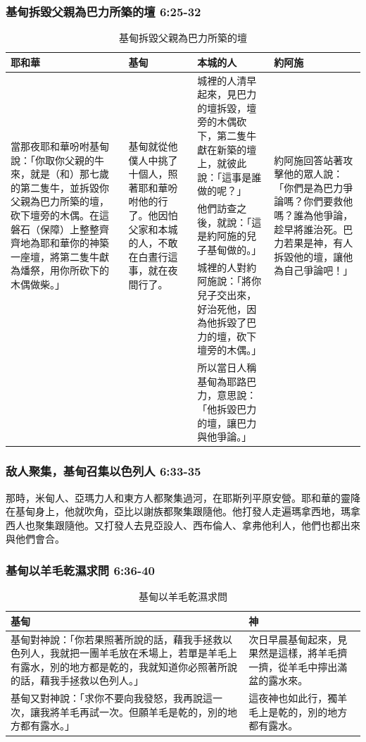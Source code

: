 \subsubsection{基甸拆毀父親為巴力所築的壇 6:25-32}
\begin{table}[H]
\centering
\begin{tabular}{p{4.7cm}|p{2.6cm}|p{6.38cm}|p{3.3cm}}\hline\hline
耶和華&基甸&本城的人&約阿施\\\hline
\multirow{3}{4.7cm}{當那夜耶和華吩咐基甸說：「你取你父親的牛來，就是（和）那七歲的第二隻牛，並拆毀你父親為巴力所築的壇，砍下壇旁的木偶。在這磐石（保障）上整整齊齊地為耶和華你的神築一座壇，將第二隻牛獻為燔祭，用你所砍下的木偶做柴。」}
&\multirow{3}{2.8cm}{基甸就從他僕人中挑了十個人，照著耶和華吩咐他的行了。他因怕父家和本城的人，不敢在白晝行這事，就在夜間行了。}
&城裡的人清早起來，見巴力的壇拆毀，壇旁的木偶砍下，第二隻牛獻在新築的壇上，就彼此說：「這事是誰做的呢？」
&\multirow{3}{3.35cm}{約阿施回答站著攻擊他的眾人說：「你們是為巴力爭論嗎？你們要救他嗎？誰為他爭論，趁早將誰治死。巴力若果是神，有人拆毀他的壇，讓他為自己爭論吧！」}\\\cline{3-3}
&&他們訪查之後，就說：「這是約阿施的兒子基甸做的。」 &\\\cline{3-3}
&&城裡的人對約阿施說：「將你兒子交出來，好治死他，因為他拆毀了巴力的壇，砍下壇旁的木偶。」 &\\\hline
&&所以當日人稱基甸為耶路巴力，意思說：「他拆毀巴力的壇，讓巴力與他爭論。」&\\\hline
 \end{tabular}
\caption{基甸拆毀父親為巴力所築的壇}
\end{table}



\subsubsection{敌人聚集，基甸召集以色列人 6:33-35}
那時，米甸人、亞瑪力人和東方人都聚集過河，在耶斯列平原安營。耶和華的靈降在基甸身上，他就吹角，亞比以謝族都聚集跟隨他。他打發人走遍瑪拿西地，瑪拿西人也聚集跟隨他。又打發人去見亞設人、西布倫人、拿弗他利人，他們也都出來與他們會合。

\subsubsection{基甸以羊毛乾濕求問 6:36-40}
\begin{table}[H]
\centering
\begin{tabular}{p{9.5cm}|p{7.5cm}}\hline\hline
基甸&神\\\hline
基甸對神說：「你若果照著所說的話，藉我手拯救以色列人，我就把一團羊毛放在禾場上，若單是羊毛上有露水，別的地方都是乾的，我就知道你必照著所說的話，藉我手拯救以色列人。」 
&次日早晨基甸起來，見果然是這樣，將羊毛擠一擠，從羊毛中擰出滿盆的露水來。\\\hline
基甸又對神說：「求你不要向我發怒，我再說這一次，讓我將羊毛再試一次。但願羊毛是乾的，別的地方都有露水。」&這夜神也如此行，獨羊毛上是乾的，別的地方都有露水。\\\hline
 \end{tabular}
\caption{基甸以羊毛乾濕求問}
\end{table}


